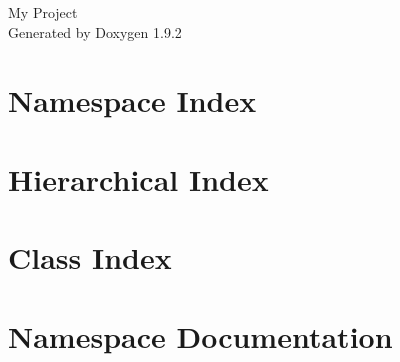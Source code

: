 \documentclass[twoside]{book}
\newcommand{\+}{\discretionary{\mbox{\scriptsize$\hookleftarrow$}}{}{}}
\newcommand{\clearemptydoublepage}{%
    \newpage{\pagestyle{empty}\cleardoublepage}%
  }
\begin{document}
  \raggedbottom
    \hypersetup{pageanchor=false,
                bookmarksnumbered=true,
                pdfencoding=unicode
               }
  \begin{titlepage}
  \vspace*{7cm}
  \begin{center}%
  {\Large My Project}\\
  \vspace*{1cm}
  {\large Generated by Doxygen 1.9.2}\\
  \end{center}
  \end{titlepage}
  \clearemptydoublepage
  \tableofcontents
  \clearemptydoublepage
  \hypersetup{pageanchor=true}
\chapter{Namespace Index}

\chapter{Hierarchical Index}

\chapter{Class Index}

\chapter{Namespace Documentation}




\end{document}
